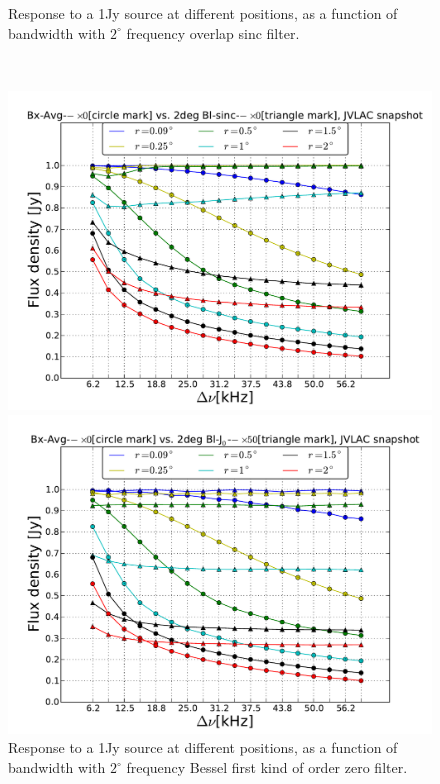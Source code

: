 \documentclass[useAMS,usenatbib]{mn2e}
\begin{document}
\begin{figure}
\begin{minipage}{0.38\linewidth}
        \caption{Response to a 1Jy source at different positions, as a function of bandwidth with $2^{\circ}$ frequency overlap sinc 
filter.}
        \label{fig:max-integ-freq-sinc-w1x50-fov2}
        \end{minipage}\\
  \begin{minipage}{0.38\linewidth}\includegraphics[width=1\textwidth]{./Figures/max-integ-freq-bessel-w1x1-fov2.pdf}
        \caption{Response to a 1Jy source at different positions, as a function of bandwidth with $2^{\circ}$ frequency Bessel first kind 
of 
  order zero filter.}
        \label{fig:max-integ-freq-bessel-w1x1-fov2}
        \end{minipage}
  \hspace{1cm}
  \begin{minipage}{0.38\linewidth}\includegraphics[width=1\textwidth]{./Figures/max-integ-freq-bessel-w1x50-fov2.pdf}

\end{minipage}
\end{figure}
\end{document}
